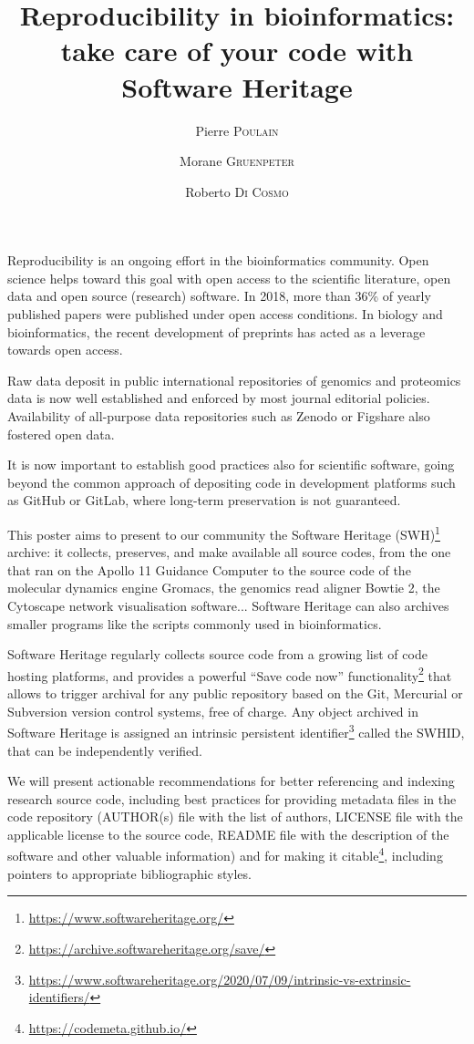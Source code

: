 \documentclass[poster, final]{jobim}
\title{Reproducibility in bioinformatics: take care of your code with Software Heritage}
\author{Pierre \textsc{Poulain}\inst{1} \and Morane \textsc{Gruenpeter}\inst{2} \and Roberto \textsc{Di Cosmo}\inst{3}}
\institute{
	Université de Paris, CNRS, Institut Jacques Monod, F-75006, Paris, France
	\and
	Software Heritage, Inria, France
	\and
	Software Heritage, Inria and University of Paris, France
}
\begin{document}

\maketitle

\setcounter{footnote}{0}

Reproducibility is an ongoing effort in the bioinformatics community\cite{kim2018}. Open science helps toward this goal with open access to the scientific literature, open data and
open source (research) software. In 2018, more than 36\% of yearly published papers were published under open access conditions\cite{trendsopenaccesspublications}. In biology and bioinformatics, the recent development of preprints has acted as a leverage towards open access.

Raw data deposit in public international repositories of genomics and proteomics data is now well established and enforced by most journal editorial policies. Availability of all-purpose data repositories such as Zenodo or Figshare also fostered open data.

It is now important to establish good practices also for scientific software,
going beyond the common approach of depositing code in development platforms
such as GitHub or GitLab, where long-term preservation is not guaranteed.

This poster aims to present to our community the Software Heritage (SWH)\footnote{\url{https://www.softwareheritage.org/}} archive\cite{dicosmo2017}: it collects, preserves, and make available all source codes, from the one that ran on the Apollo 11 Guidance Computer to the source code of the molecular dynamics engine Gromacs, the genomics read aligner Bowtie 2, the Cytoscape network visualisation software... Software Heritage can also archives smaller programs like the scripts commonly used in bioinformatics.

Software Heritage regularly collects source code from a growing list of code
hosting platforms, and provides a powerful “Save code now” functionality\footnote{\url{https://archive.softwareheritage.org/save/}} that allows to trigger archival for any
public repository based on the Git, Mercurial or Subversion version control systems, free of charge. Any object archived in Software Heritage is assigned an intrinsic persistent identifier\footnote{\url{https://www.softwareheritage.org/2020/07/09/intrinsic-vs-extrinsic-identifiers/}} called the SWHID\cite{dicosmo2020},
that can be independently verified.

We will present actionable recommendations for better referencing and indexing research source code, including best practices for providing metadata files in the code repository (AUTHOR(s) file with the list of authors, LICENSE file with the applicable license to the source code, README file with the description of the software and other valuable information) and for making it citable\footnote{\url{https://codemeta.github.io/}}, including pointers to appropriate bibliographic styles\cite{dicosmo2020}.


\printbibliography
 
\end{document}

